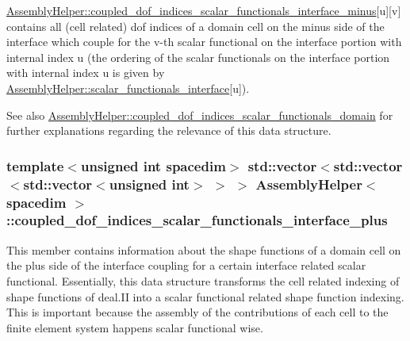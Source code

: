 \hyperlink{class_assembly_helper_a12299d82365553a21fef8529c8fe8a17}{Assembly\+Helper\+::coupled\+\_\+dof\+\_\+indices\+\_\+scalar\+\_\+functionals\+\_\+interface\+\_\+minus}\mbox{[}{\ttfamily u}\mbox{]}\mbox{[}{\ttfamily v}\mbox{]} contains all (cell related) dof indices of a domain cell on the minus side of the interface which couple for the {\ttfamily v-\/th} scalar functional on the interface portion with internal index {\ttfamily u} (the ordering of the scalar functionals on the interface portion with internal index {\ttfamily u} is given by \hyperlink{class_assembly_helper_a29aa77e0e8e6b35c94966ea88840e462}{Assembly\+Helper\+::scalar\+\_\+functionals\+\_\+interface}\mbox{[}{\ttfamily u}\mbox{]}).

See also \hyperlink{class_assembly_helper_a1a26b40224e3f04e5168accc91486493}{Assembly\+Helper\+::coupled\+\_\+dof\+\_\+indices\+\_\+scalar\+\_\+functionals\+\_\+domain} for further explanations regarding the relevance of this data structure. 
\subsubsection[{\texorpdfstring{coupled\+\_\+dof\+\_\+indices\+\_\+scalar\+\_\+functionals\+\_\+interface\+\_\+plus}{coupled_dof_indices_scalar_functionals_interface_plus}}]{\setlength{\rightskip}{0pt plus 5cm}template$<$unsigned int spacedim$>$ std\+::vector$<$std\+::vector$<$std\+::vector$<$unsigned int$>$ $>$ $>$ {\bf Assembly\+Helper}$<$ spacedim $>$\+::coupled\+\_\+dof\+\_\+indices\+\_\+scalar\+\_\+functionals\+\_\+interface\+\_\+plus\hspace{0.3cm}{\ttfamily [private]}}\hypertarget{class_assembly_helper_af07bb528fdd350e9b467b08dc44a03e7}{}\label{class_assembly_helper_af07bb528fdd350e9b467b08dc44a03e7}
This member contains information about the shape functions of a domain cell on the plus side of the interface coupling for a certain interface related scalar functional. Essentially, this data structure transforms the cell related indexing of shape functions of deal.\+II into a scalar functional related shape function indexing. This is important because the assembly of the contributions of each cell to the finite element system happens scalar functional wise.

